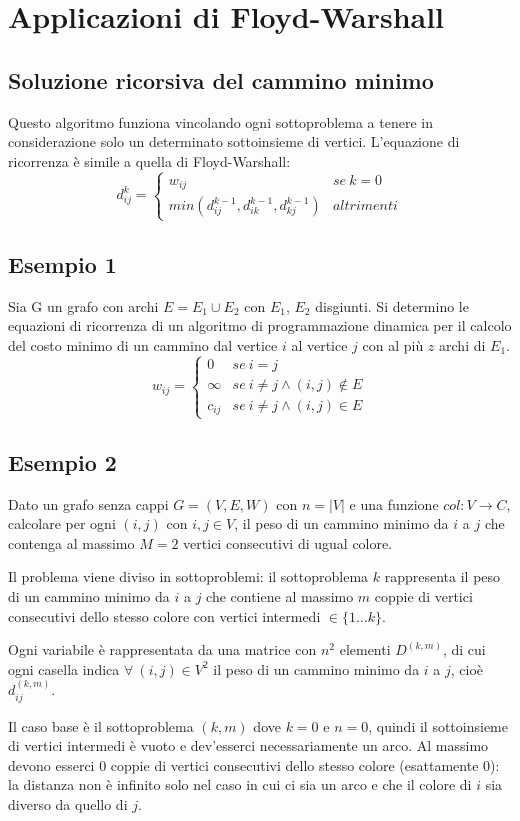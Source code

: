 \section{Applicazioni di Floyd-Warshall}
\subsection{Soluzione ricorsiva del cammino minimo}
Questo algoritmo funziona vincolando ogni sottoproblema a tenere in considerazione solo un determinato sottoinsieme di vertici. L'equazione di ricorrenza è simile a quella di Floyd-Warshall: 
$$d_{ij}^k = \begin{cases}
	w_{ij} & se\ k = 0 \\
	min(d_{ij}^{k-1}, d_{ik}^{k-1}, d_{kj}^{k-1}) & altrimenti
\end{cases}$$

\subsection{Esempio 1}
Sia G un grafo con archi $E = E_1 \cup E_2$ con $E_1$, $E_2$ disgiunti. Si determino le equazioni di ricorrenza di un algoritmo di programmazione dinamica per il calcolo del costo minimo di un cammino dal vertice $i$ al vertice $j$ con al più $z$ archi di $E_1$.
$$w_{ij} = \begin{cases}
0 & se\ i = j \\
\infty & se\ i \neq j \land (i, j) \notin E \\
c_{ij} & se\ i \neq j \land (i, j) \in E
\end{cases}$$

\subsection{Esempio 2}
Dato un grafo senza cappi $G = (V, E, W)$ con $n = |V|$ e una funzione $col : V \rightarrow C$, calcolare per ogni $(i, j)$ con $i, j \in V$, il peso di un cammino minimo da $i$ a $j$ che contenga al massimo $M = 2$ vertici consecutivi di ugual colore.

Il problema viene diviso in sottoproblemi: il sottoproblema $k$ rappresenta il peso di un cammino minimo da $i$ a $j$ che contiene al massimo $m$ coppie di vertici consecutivi dello stesso colore con vertici intermedi $\in \{1\dots k\}$.

Ogni variabile è rappresentata da una matrice con $n^2$ elementi $D^{(k, m)}$, di cui ogni casella indica $\forall\ (i, j) \in V^2$ il peso di un cammino minimo da $i$ a $j$, cioè $d_{ij}^{(k, m)}$.

Il caso base è il sottoproblema $(k, m)$ dove $k = 0$ e $n = 0$, quindi il sottoinsieme di vertici intermedi è vuoto e dev'esserci necessariamente un arco. Al massimo devono esserci 0 coppie di vertici consecutivi dello stesso colore (esattamente 0): la distanza non è infinito solo nel caso in cui ci sia un arco e che il colore di $i$ sia diverso da quello di $j$.